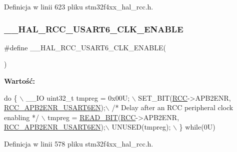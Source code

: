 Definicja w linii 623 pliku stm32f4xx\+\_\+hal\+\_\+rcc.\+h.

\mbox{\label{group___r_c_c___a_p_b2___clock___enable___disable_ga840be8a915492c85d968faec688c73ea}} 
\subsubsection{\texorpdfstring{\+\_\+\+\_\+\+H\+A\+L\+\_\+\+R\+C\+C\+\_\+\+U\+S\+A\+R\+T6\+\_\+\+C\+L\+K\+\_\+\+E\+N\+A\+B\+LE}{\_\_HAL\_RCC\_USART6\_CLK\_ENABLE}}
{\footnotesize\ttfamily \#define \+\_\+\+\_\+\+H\+A\+L\+\_\+\+R\+C\+C\+\_\+\+U\+S\+A\+R\+T6\+\_\+\+C\+L\+K\+\_\+\+E\+N\+A\+B\+LE(\begin{DoxyParamCaption}{ }\end{DoxyParamCaption})}

{\bfseries Wartość\+:}
\begin{DoxyCode}
\textcolor{keywordflow}{do} \{ \(\backslash\)
                                        \_\_IO uint32\_t tmpreg = 0x00U; \(\backslash\)
                                        SET\_BIT(\hyperlink{group___peripheral__declaration_ga74944438a086975793d26ae48d5882d4}{RCC}->APB2ENR, 
      \hyperlink{group___peripheral___registers___bits___definition_ga0569d91f3b18ae130b7a09e0100c4459}{RCC\_APB2ENR\_USART6EN});\(\backslash\)
                                        \textcolor{comment}{/* Delay after an RCC peripheral clock enabling */} \(\backslash\)
                                        tmpreg = \hyperlink{group___exported__macro_ga822bb1bb9710d5f2fa6396b84e583c33}{READ\_BIT}(\hyperlink{group___peripheral__declaration_ga74944438a086975793d26ae48d5882d4}{RCC}->APB2ENR, 
      \hyperlink{group___peripheral___registers___bits___definition_ga0569d91f3b18ae130b7a09e0100c4459}{RCC\_APB2ENR\_USART6EN});\(\backslash\)
                                        UNUSED(tmpreg); \(\backslash\)
                                          \} \textcolor{keywordflow}{while}(0U)
\end{DoxyCode}


Definicja w linii 578 pliku stm32f4xx\+\_\+hal\+\_\+rcc.\+h.

